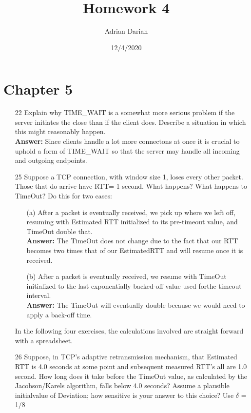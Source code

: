 \documentclass[a4paper]{article}
\title{Homework 4}
\author{Adrian Darian}
\date{12/4/2020}
\begin{document}
  
\maketitle
  
\section*{Chapter 5}
\begin{itemize}
	\item[22] Explain why TIME\_WAIT is a somewhat more serious problem if the server initiates the close than if the client does. Describe a situation in which this might reasonably happen. \\
	      \textbf{Answer:} Since clients handle a lot more connectons at once it is crucial to uphold a form of TIME\_WAIT so that the server may handle all incoming and outgoing endpoints.
	\item[25] Suppose a TCP connection, with window size 1, loses every other packet. Those that do arrive have RTT= 1 second. What happens? What happens to TimeOut? Do this for two cases: \\
	      \begin{itemize}
	      	\item[(a)] After a packet is eventually received, we pick up where we left off, resuming with Estimated RTT initialized to its pre-timeout value, and TimeOut double that. \\
	      	      \textbf{Answer:} The TimeOut does not change due to the fact that our RTT becomes two times that of our EstimatedRTT and will resume once it is received.
	      	\item[(b)] After a packet is eventually received, we resume with TimeOut initialized to the last exponentially backed-off value used forthe timeout interval. \\
	      	      \textbf{Answer:} The TimeOut will eventually double because we would need to apply a back-off time.
	      \end{itemize} 
	      In the following four exercises, the calculations involved are straight forward with a spreadsheet. 
	\item[26] Suppose, in TCP’s adaptive retransmission mechanism, that Estimated RTT is 4.0 seconds at some point and subsequent measured RTT’s all are 1.0 second. How long does it take before the TimeOut value, as calculated by the Jacobson/Karels algorithm, falls below 4.0 seconds? Assume a plausible initialvalue of Deviation; how sensitive is your answer to this choice? Use $\si{\delta}$ = 1/8 \\

\end{itemize}
\end{document}
